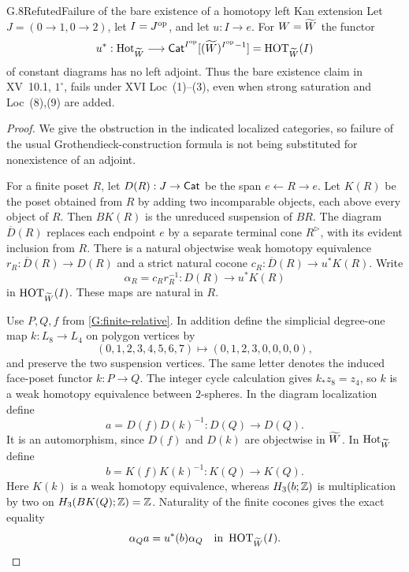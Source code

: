 \begin{claim}{G.8}{Refuted}{Failure of the bare existence of a homotopy left Kan extension}
\label{G:no-left-adjoint}
Let $J=(0\to1,0\to2)$, let $I=J^{\mathrm{op}}$, and let $u:I\to e$.
For $W=\widetilde W$ the functor
\[
 u^*:\operatorname{Hot}_{\widetilde W}\longrightarrow
 \mathsf{Cat}^{I^{\mathrm{op}}}[(\widetilde W)^{I^{\mathrm{op}}}{}^{-1}]
       =\operatorname{HOT}_{\widetilde W}(I)
\]
of constant diagrams has no left adjoint.  Thus the bare existence
claim in XV~10.1, $1^\circ$, fails under XVI Loc~(1)--(3), even when
strong saturation and Loc~(8),(9) are added.
\end{claim}
\begin{proof}
We give the obstruction in the indicated localized categories, so
failure of the usual Grothendieck-construction formula is not being
substituted for nonexistence of an adjoint.

For a finite poset $R$, let $D(R):J\to\mathsf{Cat}$ be the span
$e\leftarrow R\to e$.  Let $K(R)$ be the poset obtained from $R$
by adding two incomparable objects, each above every object of $R$.
Then $BK(R)$ is the unreduced suspension of $BR$.  The diagram
$\overline D(R)$ replaces each endpoint $e$ by a separate terminal
cone $R^{\triangleright}$, with its evident inclusion from $R$.
There is a natural objectwise weak homotopy equivalence
$r_R:\overline D(R)\to D(R)$ and a strict natural cocone
$c_R:\overline D(R)\to u^*K(R)$.  Write
\[
 \alpha_R=c_Rr_R^{-1}:D(R)\longrightarrow u^*K(R)
\]
in $\operatorname{HOT}_{\widetilde W}(I)$.  These maps are natural in $R$.

Use $P,Q,f$ from \ref{G:finite-relative}.  In addition define the
simplicial degree-one map $k:L_8\to L_4$ on polygon vertices by
\[
 (0,1,2,3,4,5,6,7)\longmapsto(0,1,2,3,0,0,0,0),
\]
and preserve the two suspension vertices.  The same letter denotes
the induced face-poset functor $k:P\to Q$.  The integer cycle
calculation gives $k_*z_8=z_4$, so $k$ is a weak homotopy equivalence
between $2$-spheres.  In the diagram localization define
\[
 a=D(f)D(k)^{-1}:D(Q)\longrightarrow D(Q).
\]
It is an automorphism, since $D(f)$ and $D(k)$ are objectwise in
$\widetilde W$.  In $\operatorname{Hot}_{\widetilde W}$ define
\[
 b=K(f)K(k)^{-1}:K(Q)\longrightarrow K(Q).
\]
Here $K(k)$ is a weak homotopy equivalence, whereas $H_3(b;\mathbb Z)$ is
multiplication by two on $H_3(BK(Q);\mathbb Z)=\mathbb Z$.  Naturality of the
finite cocones gives the exact equality
\[
 \alpha_Q a=u^*(b)\alpha_Q
       \quad\text{in }\operatorname{HOT}_{\widetilde W}(I).
\]


\end{proof}
